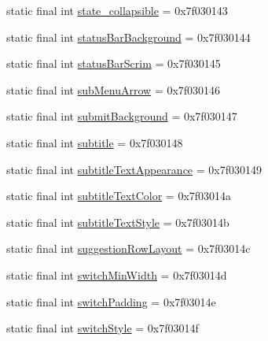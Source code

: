 \begin{DoxyCompactItemize}
\item 
static final int \mbox{\hyperlink{classandroid_1_1support_1_1design_1_1R_1_1attr_a93b11290cc862e34e79946b7c53808a6}{state\+\_\+collapsible}} = 0x7f030143
\item 
static final int \mbox{\hyperlink{classandroid_1_1support_1_1design_1_1R_1_1attr_af517b42fef9de0ee9f0c072a68ed3def}{status\+Bar\+Background}} = 0x7f030144
\item 
static final int \mbox{\hyperlink{classandroid_1_1support_1_1design_1_1R_1_1attr_af538f6ecd93db1a2674c631aced77466}{status\+Bar\+Scrim}} = 0x7f030145
\item 
static final int \mbox{\hyperlink{classandroid_1_1support_1_1design_1_1R_1_1attr_a78e3c6c4af19cc821d1ba576114859ca}{sub\+Menu\+Arrow}} = 0x7f030146
\item 
static final int \mbox{\hyperlink{classandroid_1_1support_1_1design_1_1R_1_1attr_ad9be89c201a762e3bd82044528308173}{submit\+Background}} = 0x7f030147
\item 
static final int \mbox{\hyperlink{classandroid_1_1support_1_1design_1_1R_1_1attr_addd493f9beeeda303020cd3551494034}{subtitle}} = 0x7f030148
\item 
static final int \mbox{\hyperlink{classandroid_1_1support_1_1design_1_1R_1_1attr_a6ca00057c3d0f91c410d0a1dedae8ced}{subtitle\+Text\+Appearance}} = 0x7f030149
\item 
static final int \mbox{\hyperlink{classandroid_1_1support_1_1design_1_1R_1_1attr_a93636a8a2cbf8a8482c2de1404e776a5}{subtitle\+Text\+Color}} = 0x7f03014a
\item 
static final int \mbox{\hyperlink{classandroid_1_1support_1_1design_1_1R_1_1attr_a75b165e034b7316ce6c972f6498f101e}{subtitle\+Text\+Style}} = 0x7f03014b
\item 
static final int \mbox{\hyperlink{classandroid_1_1support_1_1design_1_1R_1_1attr_a7918790cb5a25e1270e1bf43a16cc2a0}{suggestion\+Row\+Layout}} = 0x7f03014c
\item 
static final int \mbox{\hyperlink{classandroid_1_1support_1_1design_1_1R_1_1attr_a1c4c95bc20c66b6bbb0a5e8aa9017ce5}{switch\+Min\+Width}} = 0x7f03014d
\item 
static final int \mbox{\hyperlink{classandroid_1_1support_1_1design_1_1R_1_1attr_a50d44cc963c1f7a6300e08d870c28bad}{switch\+Padding}} = 0x7f03014e
\item 
static final int \mbox{\hyperlink{classandroid_1_1support_1_1design_1_1R_1_1attr_aefa144eea4f788e6b7043203c6527b8a}{switch\+Style}} = 0x7f03014f
\item 

\end{DoxyCompactItemize}
